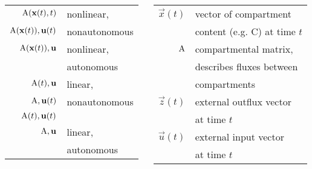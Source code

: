 \begin{columns}
	\setlength{\lc}{0.5\textwidth}
	\begin{column}{\lc}
		\begin{tabular}{rl}
		 $\mathbf{\mathrm{A}}(\mathbf{x}(t), t)$ & nonlinear, \\
		 $\mathbf{\mathrm{A}}(\mathbf{x}(t)), \mathbf{u}(t)$ & nonautonomous\\
		 \hline
		 $\mathbf{\mathrm{A}}(\mathbf{x}(t)), \mathbf{u}$ & nonlinear,\\
		& autonomous \\
		 \hline
		 $\mathbf{\mathrm{A}}(t), \mathbf{u}$ & linear, \\
		 $\mathbf{\mathrm{A}}, \mathbf{u}(t)$ & nonautonomous\\
		 $\mathbf{\mathrm{A}}(t), \mathbf{u}(t)$\\
		 \hline
		 $\mathbf{\mathrm{A}}, \mathbf{u}$ & linear,\\
		&  autonomous
		\end{tabular}
	\end{column}
	\setlength{\rc}{\the\dimexpr (\textwidth-\lc) \relax }
	\begin{column}{\rc}
		\begin{tabular}{rl}
		  $\vec{x}(t)$ & vector of compartment \\
		& content (e.g. C) at time $t$\\
		  $\mathbf{\mathrm{A}}$ & compartmental matrix,\\
		 & describes fluxes between\\
		 & compartments\\
		  $\vec{z}(t)$ & external outflux vector\\
		 &  at time $t$\\
		  $\vec{u}(t)$ & external input vector\\
		 & at time $t$\\
		\end{tabular}
	\end{column}
\end{columns}
